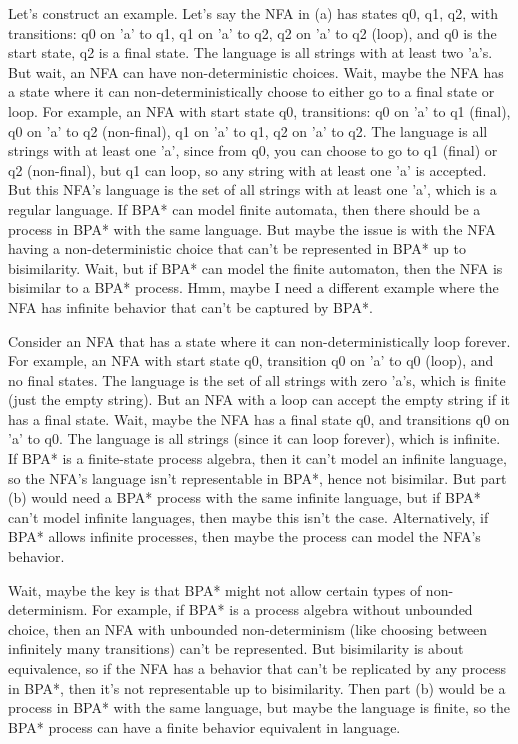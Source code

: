 Let's construct an example. Let's say the NFA in (a) has states q0, q1, q2, with transitions: q0 on 'a' to q1, q1 on 'a' to q2, q2 on 'a' to q2 (loop), and q0 is the start state, q2 is a final state. The language is all strings with at least two 'a's. But wait, an NFA can have non-deterministic choices. Wait, maybe the NFA has a state where it can non-deterministically choose to either go to a final state or loop. For example, an NFA with start state q0, transitions: q0 on 'a' to q1 (final), q0 on 'a' to q2 (non-final), q1 on 'a' to q1, q2 on 'a' to q2. The language is all strings with at least one 'a', since from q0, you can choose to go to q1 (final) or q2 (non-final), but q1 can loop, so any string with at least one 'a' is accepted. But this NFA's language is the set of all strings with at least one 'a', which is a regular language. If BPA* can model finite automata, then there should be a process in BPA* with the same language. But maybe the issue is with the NFA having a non-deterministic choice that can't be represented in BPA* up to bisimilarity. Wait, but if BPA* can model the finite automaton, then the NFA is bisimilar to a BPA* process. Hmm, maybe I need a different example where the NFA has infinite behavior that can't be captured by BPA*.

Consider an NFA that has a state where it can non-deterministically loop forever. For example, an NFA with start state q0, transition q0 on 'a' to q0 (loop), and no final states. The language is the set of all strings with zero 'a's, which is finite (just the empty string). But an NFA with a loop can accept the empty string if it has a final state. Wait, maybe the NFA has a final state q0, and transitions q0 on 'a' to q0. The language is all strings (since it can loop forever), which is infinite. If BPA* is a finite-state process algebra, then it can't model an infinite language, so the NFA's language isn't representable in BPA*, hence not bisimilar. But part (b) would need a BPA* process with the same infinite language, but if BPA* can't model infinite languages, then maybe this isn't the case. Alternatively, if BPA* allows infinite processes, then maybe the process can model the NFA's behavior.

Wait, maybe the key is that BPA* might not allow certain types of non-determinism. For example, if BPA* is a process algebra without unbounded choice, then an NFA with unbounded non-determinism (like choosing between infinitely many transitions) can't be represented. But bisimilarity is about equivalence, so if the NFA has a behavior that can't be replicated by any process in BPA*, then it's not representable up to bisimilarity. Then part (b) would be a process in BPA* with the same language, but maybe the language is finite, so the BPA* process can have a finite behavior equivalent in language.

